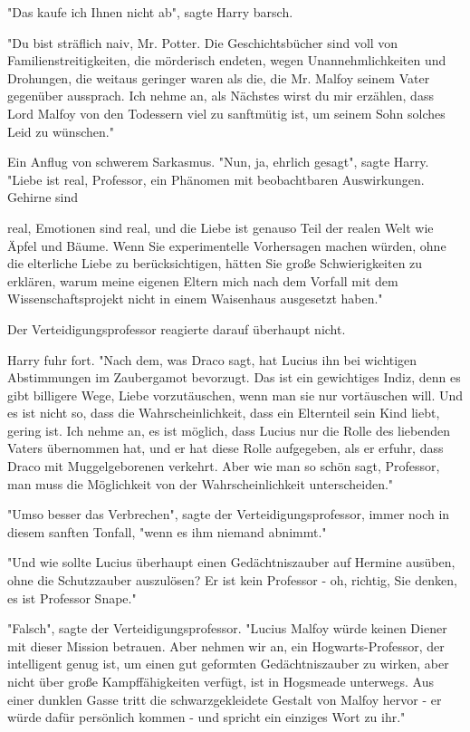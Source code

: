 {"Das kaufe ich Ihnen nicht ab", sagte Harry barsch.

"Du bist sträflich naiv, Mr. Potter. Die Geschichtsbücher sind voll von Familienstreitigkeiten, die mörderisch endeten, wegen Unannehmlichkeiten und Drohungen, die weitaus geringer waren als die, die Mr. Malfoy seinem Vater gegenüber aussprach. Ich nehme an, als Nächstes wirst du mir erzählen, dass Lord Malfoy von den Todessern viel zu sanftmütig ist, um seinem Sohn solches Leid zu wünschen."

Ein Anflug von schwerem Sarkasmus. "Nun, ja, ehrlich gesagt", sagte Harry. "Liebe ist real, Professor, ein Phänomen mit beobachtbaren Auswirkungen. Gehirne sind

real, Emotionen sind real, und die Liebe ist genauso Teil der realen Welt wie Äpfel und Bäume. Wenn Sie experimentelle Vorhersagen machen würden, ohne die elterliche Liebe zu berücksichtigen, hätten Sie große Schwierigkeiten zu erklären, warum meine eigenen Eltern mich nach dem Vorfall mit dem Wissenschaftsprojekt nicht in einem Waisenhaus ausgesetzt haben."

Der Verteidigungsprofessor reagierte darauf überhaupt nicht.

Harry fuhr fort. "Nach dem, was Draco sagt, hat Lucius ihn bei wichtigen Abstimmungen im Zaubergamot bevorzugt. Das ist ein gewichtiges Indiz, denn es gibt billigere Wege, Liebe vorzutäuschen, wenn man sie nur vortäuschen will. Und es ist nicht so, dass die Wahrscheinlichkeit, dass ein Elternteil sein Kind liebt, gering ist. Ich nehme an, es ist möglich, dass Lucius nur die Rolle des liebenden Vaters übernommen hat, und er hat diese Rolle aufgegeben, als er erfuhr, dass Draco mit Muggelgeborenen verkehrt. Aber wie man so schön sagt, Professor, man muss die Möglichkeit von der Wahrscheinlichkeit unterscheiden."

"Umso besser das Verbrechen", sagte der Verteidigungsprofessor, immer noch in diesem sanften Tonfall, "wenn es ihm niemand abnimmt."

"Und wie sollte Lucius überhaupt einen Gedächtniszauber auf Hermine ausüben, ohne die Schutzzauber auszulösen? Er ist kein Professor - oh, richtig, Sie denken, es ist Professor Snape."

"Falsch", sagte der Verteidigungsprofessor. "Lucius Malfoy würde keinen Diener mit dieser Mission betrauen. Aber nehmen wir an, ein Hogwarts-Professor, der intelligent genug ist, um einen gut geformten Gedächtniszauber zu wirken, aber nicht über große Kampffähigkeiten verfügt, ist in Hogsmeade unterwegs. Aus einer dunklen Gasse tritt die schwarzgekleidete Gestalt von Malfoy hervor - er würde dafür persönlich kommen - und spricht ein einziges Wort zu ihr."

}
